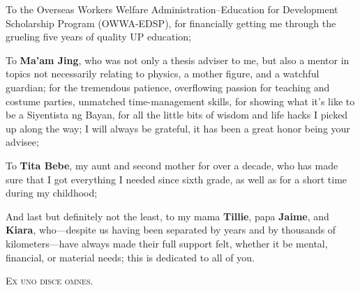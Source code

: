 To the Overseas Workers Welfare Administration--Education for Development Scholarship Program (OWWA-EDSP), for financially getting me through the grueling five years of quality UP education;

To \textbf{Ma'am Jing}, who was not only a thesis adviser to me, but also a mentor in topics not necessarily relating to physics, a mother figure, and a watchful guardian; for the tremendous patience, overflowing passion for teaching and costume parties, unmatched time-management skills, for showing what it's like to be a Siyentista ng Bayan, for all the little bits of wisdom and life hacks I picked up along the way; I will always be grateful, it has been a great honor being your advisee;

To \textbf{Tita Bebe}, my aunt and second mother for over a decade, who has made sure that I got everything I needed since sixth grade, as well as for a short time during my childhood;

And last but definitely not the least, to my mama \textbf{Tillie}, papa \textbf{Jaime}, and \textbf{Kiara}, who---despite us having been separated by years and by thousands of kilometers---have always made their full support felt, whether it be mental, financial, or material needs; this is dedicated to all of you.

\vfill

\begin{center}
	\textsc{Ex uno disce omnes.}
\end{center}